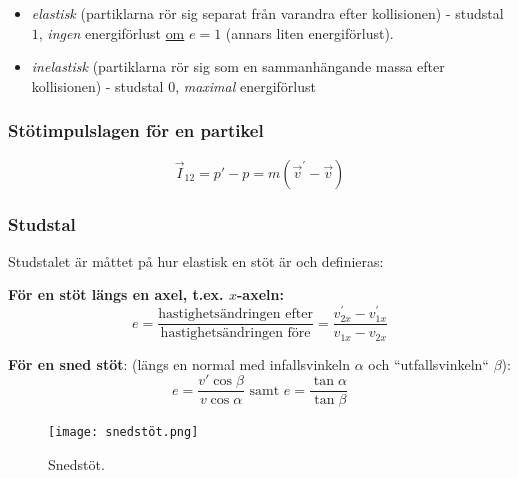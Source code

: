 \documentclass{article}
\newenvironment{ankiflashcard}[1]{}{}
\begin{document}
\begin{paracol}{2}
\begin{ankiflashcard}{Förklara de olika typerna av stötar som finns, hur energiförlusten ser ut och vad studstalet är.}
    
\begin{itemize}
    \item \textit{elastisk} (partiklarna rör sig separat från varandra efter kollisionen) - studstal $1$, \color{blue}\textit{ingen }\color{black} energiförlust \underline{om} $e=1$ (annars liten energiförlust).
    \item  \textit{inelastisk } (partiklarna rör sig som en sammanhängande massa efter kollisionen) - studstal $0$, \color{red}\textit{maximal }\color{black} energiförlust
\end{itemize}
\end{ankiflashcard}

\begin{ankiflashcard}{Formulera stötimpulslagen för en partikel}
\subsubsection{Stötimpulslagen för en partikel}
$$\vec I_{12} = p'-p=m(\vec v^{\prime} - \vec v)$$
\end{ankiflashcard}


\subsubsection{Studstal}
Studstalet är måttet på hur elastisk en stöt är och definieras:


\begin{ankiflashcard}{Ange de olika formlerna för studstal, inklusive snedstöt.}
    
\textbf{För en stöt längs en axel, t.ex. $x$-axeln:}
$$
e=\frac{\text{hastighetsändringen efter}}{\text{hastighetsändringen före}}=\frac{v_{2x}^{\prime}-{v_{1x}^{\prime}}}{v_{1x}-v_{2x}}
$$


\textbf{För en sned stöt}:
(längs en normal med infallsvinkeln $\alpha$ och ``utfallsvinkeln`` $\beta$):
$$
e=\frac{v'\cos\beta}{v\cos\alpha}\text{ samt } e =\frac{\tan \alpha}{\tan \beta}
$$
\begin{figure}[H]
    \centering
\texttt{[image: snedstöt.png]}
    \caption{Snedstöt.}
\end{figure}
\end{ankiflashcard}


\end{paracol}
\end{document}
